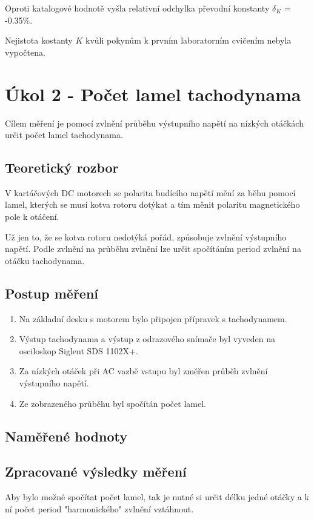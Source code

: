 \documentclass{protokol}
\begin{document}
        Oproti katalogové hodnotě vyšla relativní odchylka převodní konstanty \linebreak $\delta_K$ = -0.35$\%$. 

        Nejistota kostanty $K$ kvůli pokynům k prvním laboratorním cvičením nebyla vypočtena.

\pagebreak

\section{Úkol 2 - Počet lamel tachodynama}
    Cílem měření je pomocí zvlnění průběhu výstupního napětí na nízkých otáčkách určit počet lamel tachodynama. 
    \subsection{Teoretický rozbor}
        V kartáčových DC motorech se polarita budícího napětí mění za běhu pomocí lamel, kterých se musí kotva rotoru dotýkat a tím měnit polaritu magnetického pole k otáčení.
        
        Už jen to, že se kotva rotoru nedotýká pořád, způsobuje zvlnění výstupního napětí. Podle zvlnění na průběhu zvlnění lze určit spočítáním period zvlnění na otáčku tachodynama.
    \subsection{Postup měření}
        \begin{enumerate}
             \item Na základní desku s motorem bylo připojen přípravek s tachodynamem.
             \item Výstup tachodynama a výstup z odrazového snímače byl vyveden na osciloskop Siglent SDS 1102X+.
             \item Za nízkých otáček při AC vazbě vstupu byl změřen průběh zvlnění výstupního napětí.
             \item Ze zobrazeného průběhu byl spočítán počet lamel.
        \end{enumerate}
    \subsection{Naměřené hodnoty}

    \pagebreak
    \subsection{Zpracované výsledky měření}
        Aby bylo možné spočítat počet lamel, tak je nutné si určit délku jedné otáčky a k ní počet period "harmonického" zvlnění vztáhnout.
\end{document}
